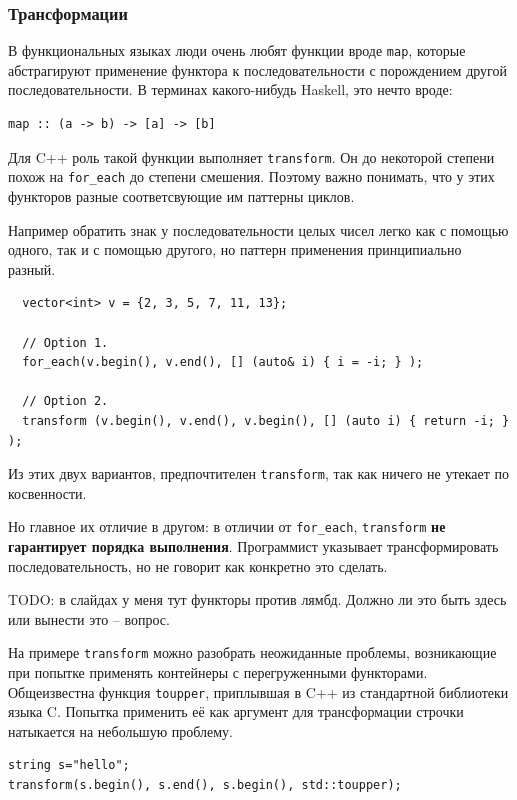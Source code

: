 \documentclass[a4paper,12pt,oneside]{article}
\begin{document}
\subsubsection{Трансформации}

В функциональных языках люди очень любят функции вроде \lstinline!map!, которые абстрагируют применение функтора к последовательности с порождением другой последовательности. В терминах какого-нибудь Haskell, это нечто вроде:

\begin{verbatim}
map :: (a -> b) -> [a] -> [b]
\end{verbatim}

Для C++ роль такой функции выполняет \lstinline!transform!. Он до некоторой степени похож на \lstinline!for_each! до степени смешения. Поэтому важно понимать, что у этих функторов разные соответсвующие им паттерны циклов.

Например обратить знак у последовательности целых чисел легко как с помощью одного, так и с помощью другого, но паттерн применения принципиально разный.

\begin{lstlisting}
  vector<int> v = {2, 3, 5, 7, 11, 13};

  // Option 1.
  for_each(v.begin(), v.end(), [] (auto& i) { i = -i; } );

  // Option 2.
  transform (v.begin(), v.end(), v.begin(), [] (auto i) { return -i; } );
\end{lstlisting}

Из этих двух вариантов, предпочтителен \lstinline!transform!, так как ничего не утекает по косвенности. 

Но главное их отличие в другом: в отличии от \lstinline!for_each!, \lstinline!transform! \textbf{не гарантирует порядка выполнения}. Программист указывает трансформировать последовательность, но не говорит как конкретно это сделать.

TODO: в слайдах у меня тут функторы против лямбд. Должно ли это быть здесь или вынести это -- вопрос.

На примере \lstinline!transform! можно разобрать неожиданные проблемы, возникающие при попытке применять контейнеры с перегруженными функторами. Общеизвестна функция \lstinline!toupper!, приплывшая в C++ из стандартной библиотеки языка C. Попытка применить её как аргумент для трансформации строчки натыкается на небольшую проблему.

\begin{lstlisting}
string s="hello";
transform(s.begin(), s.end(), s.begin(), std::toupper);
\end{lstlisting}
\end{document}
